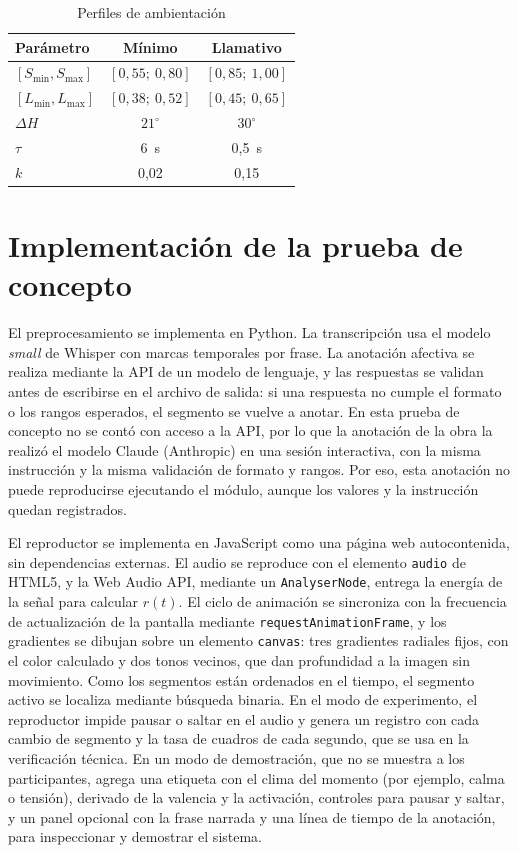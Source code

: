 \documentclass[journal]{IEEEtran}
\begin{document}
\begin{table}[t]
\centering
\caption{Perfiles de ambientación}
\label{tab:perfiles}
\begin{tabular}{lcc}
\hline
Parámetro & Mínimo & Llamativo \\
\hline
$[S_{\min}, S_{\max}]$ & $[0{,}55;\ 0{,}80]$ & $[0{,}85;\ 1{,}00]$ \\
$[L_{\min}, L_{\max}]$ & $[0{,}38;\ 0{,}52]$ & $[0{,}45;\ 0{,}65]$ \\
$\Delta H$ & $21^\circ$ & $30^\circ$ \\
$\tau$ & 6~s & 0,5~s \\
$k$ & 0,02 & 0,15 \\
\hline
\end{tabular}
\end{table}
 
\section{Implementación de la prueba de concepto}
 
El preprocesamiento se implementa en Python. La transcripción usa el modelo \textit{small} de Whisper \cite{radford2023} con marcas temporales por frase. La anotación afectiva se realiza mediante la API de un modelo de lenguaje, y las respuestas se validan antes de escribirse en el archivo de salida: si una respuesta no cumple el formato o los rangos esperados, el segmento se vuelve a anotar. En esta prueba de concepto no se contó con acceso a la API, por lo que la anotación de la obra la realizó el modelo Claude (Anthropic) en una sesión interactiva, con la misma instrucción y la misma validación de formato y rangos. Por eso, esta anotación no puede reproducirse ejecutando el módulo, aunque los valores y la instrucción quedan registrados.
 
El reproductor se implementa en JavaScript como una página web autocontenida, sin dependencias externas. El audio se reproduce con el elemento \texttt{audio} de HTML5, y la Web Audio API, mediante un \texttt{AnalyserNode}, entrega la energía de la señal para calcular $r(t)$. El ciclo de animación se sincroniza con la frecuencia de actualización de la pantalla mediante \texttt{requestAnimationFrame}, y los gradientes se dibujan sobre un elemento \texttt{canvas}: tres gradientes radiales fijos, con el color calculado y dos tonos vecinos, que dan profundidad a la imagen sin movimiento. Como los segmentos están ordenados en el tiempo, el segmento activo se localiza mediante búsqueda binaria. En el modo de experimento, el reproductor impide pausar o saltar en el audio y genera un registro con cada cambio de segmento y la tasa de cuadros de cada segundo, que se usa en la verificación técnica. En un modo de demostración, que no se muestra a los participantes, agrega una etiqueta con el clima del momento (por ejemplo, calma o tensión), derivado de la valencia y la activación, controles para pausar y saltar, y un panel opcional con la frase narrada y una línea de tiempo de la anotación, para inspeccionar y demostrar el sistema.
 
\end{document}
